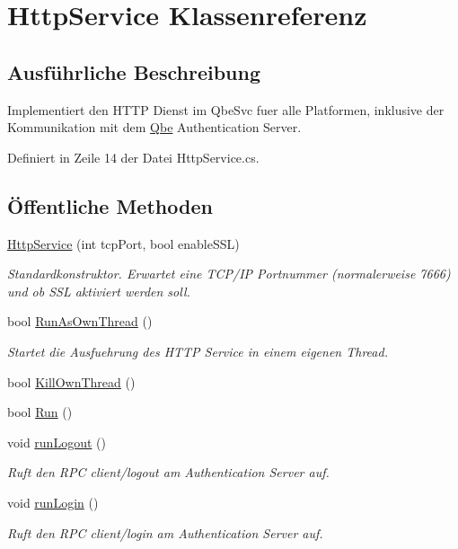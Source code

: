 \hypertarget{classQbeSAS_1_1HttpService}{
\section{Http\-Service Klassenreferenz}
\label{classQbeSAS_1_1HttpService}
}


\subsection{Ausf\"{u}hrliche Beschreibung}
Implementiert den HTTP Dienst im Qbe\-Svc fuer alle Platformen, inklusive der Kommunikation mit dem \hyperlink{namespaceQbe}{Qbe} Authentication Server. 



Definiert in Zeile 14 der Datei Http\-Service.cs.\subsection*{\"{O}ffentliche Methoden}
\begin{CompactItemize}
\item 
\hyperlink{classQbeSAS_1_1HttpService_QbeSAS_1_1HttpServicea0}{Http\-Service} (int tcp\-Port, bool enable\-SSL)
\begin{CompactList}\small\item\em Standardkonstruktor. Erwartet eine TCP/IP Portnummer (normalerweise 7666) und ob SSL aktiviert werden soll. \item\end{CompactList}\item 
bool \hyperlink{classQbeSAS_1_1HttpService_QbeSAS_1_1HttpServicea1}{Run\-As\-Own\-Thread} ()
\begin{CompactList}\small\item\em Startet die Ausfuehrung des HTTP Service in einem eigenen Thread. \item\end{CompactList}\item 
bool \hyperlink{classQbeSAS_1_1HttpService_QbeSAS_1_1HttpServicea2}{Kill\-Own\-Thread} ()
\item 
bool \hyperlink{classQbeSAS_1_1HttpService_QbeSAS_1_1HttpServicea3}{Run} ()
\item 
void \hyperlink{classQbeSAS_1_1HttpService_QbeSAS_1_1HttpServicea4}{run\-Logout} ()
\begin{CompactList}\small\item\em Ruft den RPC client/logout am Authentication Server auf. \item\end{CompactList}\item 
void \hyperlink{classQbeSAS_1_1HttpService_QbeSAS_1_1HttpServicea5}{run\-Login} ()
\begin{CompactList}\small\item\em Ruft den RPC client/login am Authentication Server auf. \item\end{CompactList}\end{CompactItemize}
